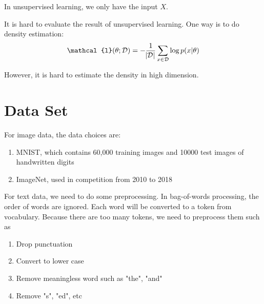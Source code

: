 In unsupervised learning, we only have the input $X$.

It is hard to evaluate the result of unsupervised learning. One way is to do density estimation:
\begin{equation}
    \mathcal{l}(\theta; \mathcal{D}) = - \frac{1}{\absolutevalue{\mathcal{D}}} \sum_{x \in \mathcal{D}} \log p(x|\theta)
\end{equation}

However, it is hard to estimate the density in high dimension.



\section{Data Set}

\begin{example}
    For image data, the data choices are:
\begin{enumerate}
    \item MNIST, which contains 60,000 training images and 10000 test images of handwritten digits
    \item ImageNet, used in competition from 2010 to 2018
\end{enumerate}
\end{example}

\begin{definition}
    For text data, we need to do some preprocessing. In bag-of-words processing, the order of words are ignored. Each word will be converted to a token from vocabulary. Because there are too many tokens, we need to preprocess them such as 
\begin{enumerate}
    \item Drop punctuation
    \item Convert to lower case
    \item Remove meaningless word such as "the", "and"
    \item Remove "s", "ed", etc
\end{enumerate}
\end{definition}

